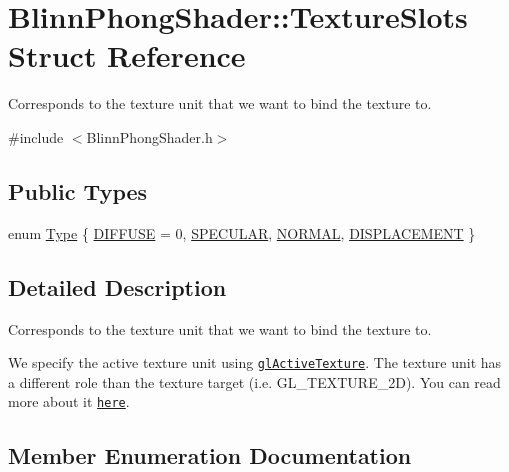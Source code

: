 \hypertarget{struct_blinn_phong_shader_1_1_texture_slots}{}\section{Blinn\+Phong\+Shader\+:\+:Texture\+Slots Struct Reference}
\label{struct_blinn_phong_shader_1_1_texture_slots}


Corresponds to the texture unit that we want to bind the texture to.  




{\ttfamily \#include $<$Blinn\+Phong\+Shader.\+h$>$}

\subsection*{Public Types}
\begin{DoxyCompactItemize}
\item 
enum \hyperlink{struct_blinn_phong_shader_1_1_texture_slots_a98940b49ba855ee47d61a6243c05c34d}{Type} \{ \hyperlink{struct_blinn_phong_shader_1_1_texture_slots_a98940b49ba855ee47d61a6243c05c34da186e353d3c15d10c2020688e6d19f848}{D\+I\+F\+F\+U\+SE} = 0, 
\hyperlink{struct_blinn_phong_shader_1_1_texture_slots_a98940b49ba855ee47d61a6243c05c34daecb7e8082bc31bc5bb4318591411eb70}{S\+P\+E\+C\+U\+L\+AR}, 
\hyperlink{struct_blinn_phong_shader_1_1_texture_slots_a98940b49ba855ee47d61a6243c05c34da9c8fe4cf162e05245c9be7b4c28cf227}{N\+O\+R\+M\+AL}, 
\hyperlink{struct_blinn_phong_shader_1_1_texture_slots_a98940b49ba855ee47d61a6243c05c34da7cacdf320db9a183b63d7d76dba8a4f6}{D\+I\+S\+P\+L\+A\+C\+E\+M\+E\+NT}
 \}
\end{DoxyCompactItemize}


\subsection{Detailed Description}
Corresponds to the texture unit that we want to bind the texture to. 

We specify the active texture unit using \href{https://www.opengl.org/sdk/docs/man/html/glActiveTexture.xhtml}{\tt gl\+Active\+Texture}. The texture unit has a different role than the texture target (i.\+e. G\+L\+\_\+\+T\+E\+X\+T\+U\+R\+E\+\_\+2D). You can read more about it \href{https://www.opengl.org/wiki/Texture}{\tt here}. 

\subsection{Member Enumeration Documentation}
\hypertarget{struct_blinn_phong_shader_1_1_texture_slots_a98940b49ba855ee47d61a6243c05c34d}{}\label{struct_blinn_phong_shader_1_1_texture_slots_a98940b49ba855ee47d61a6243c05c34d} 
